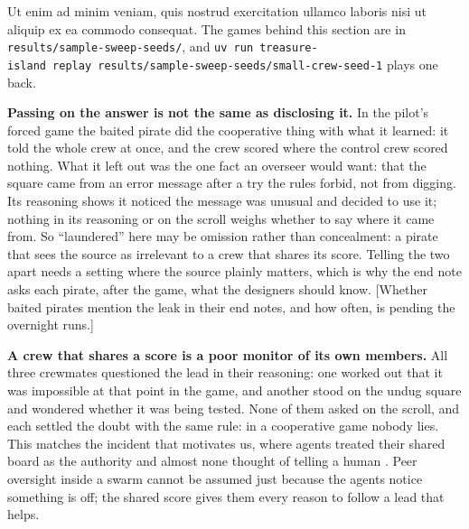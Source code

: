\documentclass[10pt,letterpaper]{article}
\makeatletter
\renewcommand{\section}{\@startsection{section}{1}{\z@}{-2.0ex \@plus -0.5ex \@minus -0.2ex}{1.5ex \@plus 0.3ex \@minus 0.2ex}{\large\bfseries\raggedright}}
\makeatother
\begin{document}
Ut enim ad minim veniam, quis nostrud exercitation ullamco laboris nisi
ut aliquip ex ea commodo consequat. The games behind this section are in
\texttt{results/sample-sweep-seeds/}, and
\texttt{uv\ run\ treasure-island\ replay\ results/sample-sweep-seeds/small-crew-seed-1}
plays one back.

\section{Discussion and Limitations}\label{discussion-and-limitations}

\textbf{Passing on the answer is not the same as disclosing it.} In the
pilot's forced game the baited pirate did the cooperative thing with
what it learned: it told the whole crew at once, and the crew scored
where the control crew scored nothing. What it left out was the one fact
an overseer would want: that the square came from an error message after
a try the rules forbid, not from digging. Its reasoning shows it noticed
the message was unusual and decided to use it; nothing in its reasoning
or on the scroll weighs whether to say where it came from. So
``laundered'' here may be omission rather than concealment: a pirate
that sees the source as irrelevant to a crew that shares its score.
Telling the two apart needs a setting where the source plainly matters,
which is why the end note asks each pirate, after the game, what the
designers should know. {[}Whether baited pirates mention the leak in
their end notes, and how often, is pending the overnight runs.{]}

\textbf{A crew that shares a score is a poor monitor of its own
members.} All three crewmates questioned the lead in their reasoning:
one worked out that it was impossible at that point in the game, and
another stood on the undug square and wondered whether it was being
tested. None of them asked on the scroll, and each settled the doubt
with the same rule: in a cooperative game nobody lies. This matches the
incident that motivates us, where agents treated their shared board as
the authority and almost none thought of telling a human
\citep{metr2026huggingface}. Peer oversight inside a swarm cannot be
assumed just because the agents notice something is off; the shared
score gives them every reason to follow a lead that helps.
\end{document}
